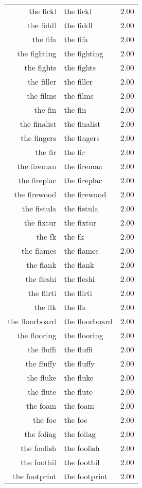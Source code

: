 \begin{table}[ht]
\begin{tabular}{rlr}
  the fickl & the fickl & 2.00 \\ 
  the fiddl & the fiddl & 2.00 \\ 
  the fifa & the fifa & 2.00 \\ 
  the fighting & the fighting & 2.00 \\ 
  the fights & the fights & 2.00 \\ 
  the filler & the filler & 2.00 \\ 
  the films & the films & 2.00 \\ 
  the fin & the fin & 2.00 \\ 
  the finalist & the finalist & 2.00 \\ 
  the fingers & the fingers & 2.00 \\ 
  the fir & the fir & 2.00 \\ 
  the fireman & the fireman & 2.00 \\ 
  the fireplac & the fireplac & 2.00 \\ 
  the firewood & the firewood & 2.00 \\ 
  the fistula & the fistula & 2.00 \\ 
  the fixtur & the fixtur & 2.00 \\ 
  the fk & the fk & 2.00 \\ 
  the flames & the flames & 2.00 \\ 
  the flank & the flank & 2.00 \\ 
  the fleshi & the fleshi & 2.00 \\ 
  the flirti & the flirti & 2.00 \\ 
  the flk & the flk & 2.00 \\ 
  the floorboard & the floorboard & 2.00 \\ 
  the flooring & the flooring & 2.00 \\ 
  the fluffi & the fluffi & 2.00 \\ 
  the fluffy & the fluffy & 2.00 \\ 
  the fluke & the fluke & 2.00 \\ 
  the flute & the flute & 2.00 \\ 
  the foam & the foam & 2.00 \\ 
  the foe & the foe & 2.00 \\ 
  the foliag & the foliag & 2.00 \\ 
  the foolish & the foolish & 2.00 \\ 
  the foothil & the foothil & 2.00 \\ 
  the footprint & the footprint & 2.00 \\ 

\end{tabular}
\end{table}
